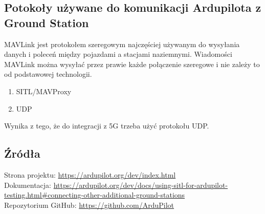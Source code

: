 \documentclass{article}
\begin{document}
\pagebreak

\subsection{Potokoły używane do komunikacji Ardupilota z Ground Station}
MAVLink jest protokołem szeregowym najczęściej używanym do wysyłania danych i poleceń między pojazdami a stacjami naziemnymi.
Wiadomości MAVLink można wysyłać przez prawie każde połączenie szeregowe i nie zależy to od podstawowej technologii.

\begin{enumerate}
    \item SITL/MAVProxy
    \item UDP
\end{enumerate}


Wynika z tego, że do integracji z 5G trzeba użyć protokołu UDP.



\subsection{Źródła}
Strona projektu: \url{https://ardupilot.org/dev/index.html}\\
Dokumentacja: \url{https://ardupilot.org/dev/docs/using-sitl-for-ardupilot-testing.html#connecting-other-additional-ground-stations}\\
Repozytorium GitHub: \url{https://github.com/ArduPilot}\\
\end{document}
